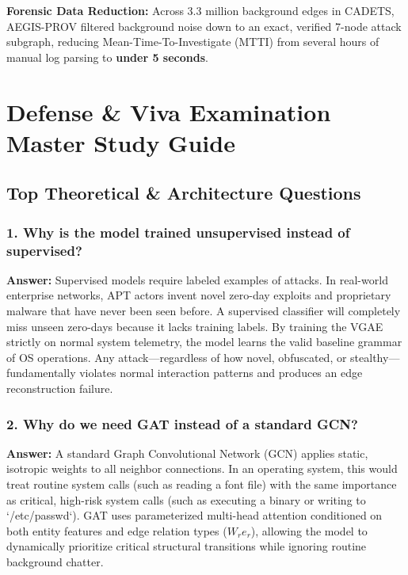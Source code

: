 \documentclass[11pt,a4paper]{report}
\begin{document}
\textbf{Forensic Data Reduction:} Across 3.3 million background edges in CADETS, AEGIS-PROV filtered background noise down to an exact, verified 7-node attack subgraph, reducing Mean-Time-To-Investigate (MTTI) from several hours of manual log parsing to \textbf{under 5 seconds}.

\chapter{Defense \& Viva Examination Master Study Guide}

\section{Top Theoretical \& Architecture Questions}

\subsection{1. Why is the model trained unsupervised instead of supervised?}
\textbf{Answer:} Supervised models require labeled examples of attacks. In real-world enterprise networks, APT actors invent novel zero-day exploits and proprietary malware that have never been seen before. A supervised classifier will completely miss unseen zero-days because it lacks training labels. By training the VGAE strictly on normal system telemetry, the model learns the valid baseline grammar of OS operations. Any attack---regardless of how novel, obfuscated, or stealthy---fundamentally violates normal interaction patterns and produces an edge reconstruction failure.

\subsection{2. Why do we need GAT instead of a standard GCN?}
\textbf{Answer:} A standard Graph Convolutional Network (GCN) applies static, isotropic weights to all neighbor connections. In an operating system, this would treat routine system calls (such as reading a font file) with the same importance as critical, high-risk system calls (such as executing a binary or writing to `/etc/passwd`). GAT uses parameterized multi-head attention conditioned on both entity features and edge relation types ($W_r e_r$), allowing the model to dynamically prioritize critical structural transitions while ignoring routine background chatter.
\end{document}
